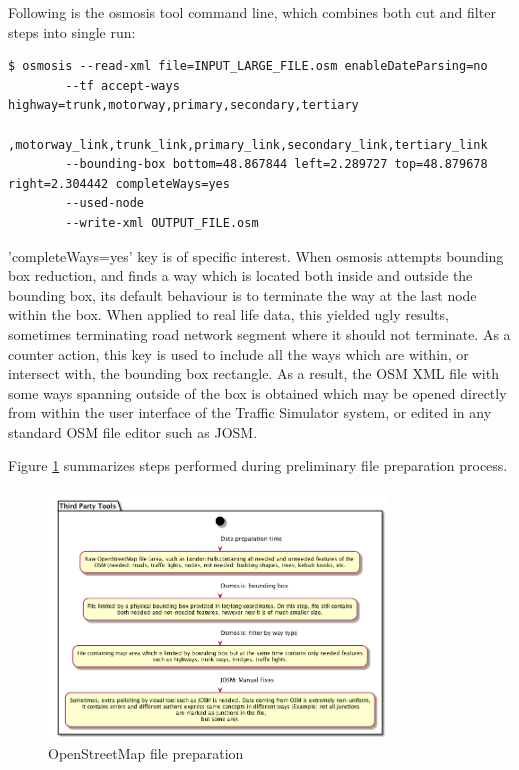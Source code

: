 Following is the osmosis tool command line, which combines both cut and filter steps into single run:
\begin{lstlisting}
$ osmosis --read-xml file=INPUT_LARGE_FILE.osm enableDateParsing=no
        --tf accept-ways highway=trunk,motorway,primary,secondary,tertiary
            ,motorway_link,trunk_link,primary_link,secondary_link,tertiary_link
        --bounding-box bottom=48.867844 left=2.289727 top=48.879678 right=2.304442 completeWays=yes
        --used-node
        --write-xml OUTPUT_FILE.osm
\end{lstlisting}
'completeWays=yes' key is of specific interest. When osmosis attempts bounding box reduction, and finds a way which is located both inside and outside the bounding box, its default behaviour is to terminate the way at the last node within the box. When applied to real life data, this yielded ugly results, sometimes terminating road network segment where it should not terminate. As a counter action, this key is used to include all the ways which are within, or intersect with, the bounding box rectangle.  As a result, the OSM XML file with some ways spanning outside of the box is obtained which may be opened directly from within the user interface of the Traffic Simulator system, or edited in any standard OSM file editor such as JOSM.

Figure \ref{fig:thirdPartyToolsOSMPreparation} summarizes steps performed during preliminary file preparation process.
\begin{figure}[h]
    \vspace{1.5em}
    \caption{OpenStreetMap file preparation}
    \label{fig:thirdPartyToolsOSMPreparation}
    \centering
    \includegraphics[width=0.8\textwidth]{../../uml_diagrams/thirdPartyToolsDataLoading.png}
    \vspace{1.5em}
\end{figure}


